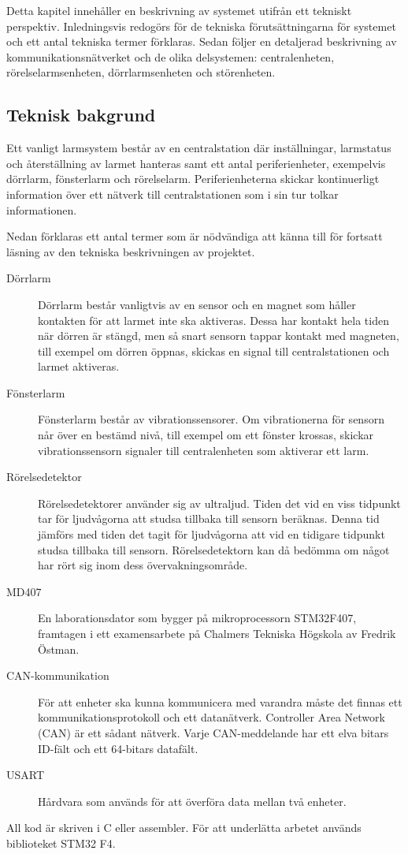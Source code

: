 Detta kapitel innehåller en beskrivning av systemet utifrån ett tekniskt perspektiv. Inledningsvis redogörs för de tekniska förutsättningarna för systemet och ett antal tekniska termer förklaras. Sedan följer en detaljerad beskrivning av kommunikationsnätverket och de olika delsystemen: centralenheten, rörelselarmsenheten,  dörrlarmsenheten och störenheten.

\subsection{Teknisk bakgrund}

Ett vanligt larmsystem består av en centralstation där inställningar,
larmstatus och återställning av larmet hanteras samt ett antal periferienheter,
exempelvis dörrlarm, fönsterlarm och rörelselarm.
Periferienheterna skickar kontinuerligt information över ett nätverk till centralstationen som i sin tur tolkar informationen.

Nedan förklaras ett antal termer som är nödvändiga att känna till för fortsatt läsning av den tekniska beskrivningen av projektet.

\begin{description}

\item [Dörrlarm] Dörrlarm består vanligtvis av en sensor och en magnet som håller kontakten för att larmet inte ska aktiveras. Dessa har kontakt hela tiden när dörren är stängd, men så snart sensorn tappar kontakt med magneten, till exempel om dörren öppnas, skickas en signal till centralstationen och larmet aktiveras.
\item [Fönsterlarm] Fönsterlarm består av vibrationssensorer. Om vibrationerna för sensorn når över en bestämd nivå, till exempel om ett fönster krossas, skickar vibrationssensorn signaler till centralenheten som aktiverar ett larm.
\item [Rörelsedetektor] Rörelsedetektorer använder sig av ultraljud. Tiden det vid en viss tidpunkt tar för ljudvågorna att studsa tillbaka till sensorn beräknas. Denna tid jämförs med tiden det tagit för ljudvågorna att vid en tidigare tidpunkt studsa tillbaka till sensorn. Rörelsedetektorn kan då bedömma om något har rört sig inom dess övervakningsområde.
\item [MD407] En laborationsdator som bygger på mikroprocessorn STM32F407, framtagen i ett examensarbete på Chalmers Tekniska Högskola av Fredrik Östman\cite{MD407}.
\item [CAN-kommunikation] För att enheter ska kunna kommunicera med varandra måste det finnas ett kommunikationsprotokoll och ett datanätverk. Controller Area Network (CAN) är ett sådant nätverk. Varje CAN-meddelande har ett elva bitars ID-fält och ett 64-bitars datafält.
\item [USART] Hårdvara som används för att överföra data mellan två enheter.
\end{description}
\smallskip
All kod är skriven i C eller assembler. För att underlätta arbetet används biblioteket STM32 F4.

